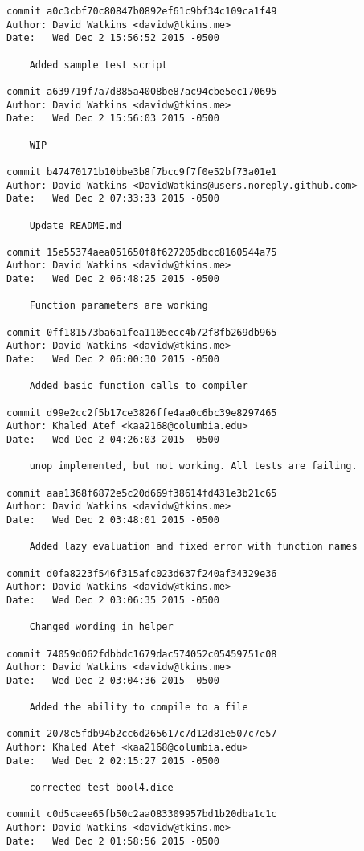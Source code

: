 \begin{verbatim}
commit a0c3cbf70c80847b0892ef61c9bf34c109ca1f49
Author: David Watkins <davidw@tkins.me>
Date:   Wed Dec 2 15:56:52 2015 -0500

    Added sample test script

commit a639719f7a7d885a4008be87ac94cbe5ec170695
Author: David Watkins <davidw@tkins.me>
Date:   Wed Dec 2 15:56:03 2015 -0500

    WIP

commit b47470171b10bbe3b8f7bcc9f7f0e52bf73a01e1
Author: David Watkins <DavidWatkins@users.noreply.github.com>
Date:   Wed Dec 2 07:33:33 2015 -0500

    Update README.md

commit 15e55374aea051650f8f627205dbcc8160544a75
Author: David Watkins <davidw@tkins.me>
Date:   Wed Dec 2 06:48:25 2015 -0500

    Function parameters are working

commit 0ff181573ba6a1fea1105ecc4b72f8fb269db965
Author: David Watkins <davidw@tkins.me>
Date:   Wed Dec 2 06:00:30 2015 -0500

    Added basic function calls to compiler

commit d99e2cc2f5b17ce3826ffe4aa0c6bc39e8297465
Author: Khaled Atef <kaa2168@columbia.edu>
Date:   Wed Dec 2 04:26:03 2015 -0500

    unop implemented, but not working. All tests are failing.

commit aaa1368f6872e5c20d669f38614fd431e3b21c65
Author: David Watkins <davidw@tkins.me>
Date:   Wed Dec 2 03:48:01 2015 -0500

    Added lazy evaluation and fixed error with function names

commit d0fa8223f546f315afc023d637f240af34329e36
Author: David Watkins <davidw@tkins.me>
Date:   Wed Dec 2 03:06:35 2015 -0500

    Changed wording in helper

commit 74059d062fdbbdc1679dac574052c05459751c08
Author: David Watkins <davidw@tkins.me>
Date:   Wed Dec 2 03:04:36 2015 -0500

    Added the ability to compile to a file

commit 2078c5fdb94b2cc6d265617c7d12d81e507c7e57
Author: Khaled Atef <kaa2168@columbia.edu>
Date:   Wed Dec 2 02:15:27 2015 -0500

    corrected test-bool4.dice

commit c0d5caee65fb50c2aa083309957bd1b20dba1c1c
Author: David Watkins <davidw@tkins.me>
Date:   Wed Dec 2 01:58:56 2015 -0500


\end{verbatim}
